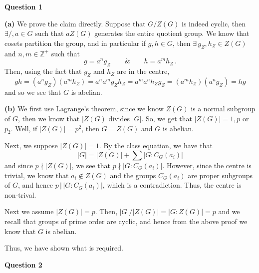 \documentclass[10pt]{article}
\newcommand{\Z}{\mathbb{Z}}
\begin{document}
\textbf{Question 1}

\textbf{(a)} We prove the claim directly. Suppose that $G/Z(G)$ is indeed cyclic, then $\exists /, a\in G$ such that $aZ(G)$ generates the entire quotient group. We know that cosets partition the group, and in particular if $g,h\in G$, then $\exists \, g_{Z}, h_{Z} \in Z(G)$ and $n,m\in \Z^{+}$ such that
\[ g = a^{n}g_{Z} \hspace{2em} \& \hspace{2em} h = a^{m}h_{Z} \, .\]
Then, using the fact that $g_{Z}$ and $h_{Z}$ are in the centre, 
\[ gh = (a^{n}g_{Z})(a^{m}h_{Z}) = a^{n}a^{m}g_{Z}h_{Z} = a^{m}a^{n}h_{Z}g_{Z} = (a^{m}h_{Z})(a^{n}g_{Z}) = hg \]
and so we see that $G$ is abelian.

\textbf{(b)} We first use Lagrange's theorem, since we know $Z(G)$ is a normal subgroup of $G$, then we know that $|Z(G)$ divides $|G|$. So, we get that $|Z(G)| = 1, p$ or $p_{2}$. Well, if $|Z(G)| = p^{2}$, then $G = Z(G)$ and $G$ is abelian.

Next, we suppose $|Z(G)| = 1$. By the class equation, we have that
\[ |G| = |Z(G)| + \sum |G: C_{G}(a_{i})| \]
and since $p \nmid |Z(G)|$, we see that $p \nmid |G:C_{G}(a_{i})|$. However, since the centre is trivial, we know that $a_{i} \notin Z(G)$ and the groups $C_{G}(a_{i})$ are proper subgroups of $G$, and hence $p \, | \, |G:C_{G}(a_{i})|$, which is a contradiction. Thus, the centre is non-trival.

Next we assume $|Z(G)| = p$. Then, $|G|/|Z(G)| = |G:Z(G)| = p$ and we recall that groups of prime order are cyclic, and hence from the above proof we know that $G$ is abelian.

Thus, we have shown what is required.


\newpage
\textbf{Question 2}
\end{document}
